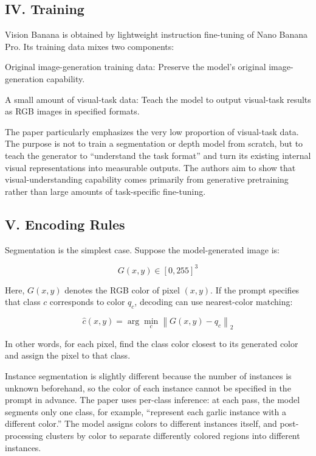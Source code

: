 \hypertarget{iv.-training}{%
\subsection{IV. Training}\label{iv.-training}}

Vision Banana is obtained by lightweight instruction fine-tuning of Nano Banana Pro. Its training data mixes two components:

Original image-generation training data: Preserve the model's original image-generation capability.

A small amount of visual-task data: Teach the model to output visual-task results as RGB images in specified formats.

The paper particularly emphasizes the very low proportion of visual-task data. The purpose is not to train a segmentation or depth model from scratch, but to teach the generator to ``understand the task format'' and turn its existing internal visual representations into measurable outputs. The authors aim to show that visual-understanding capability comes primarily from generative pretraining rather than large amounts of task-specific fine-tuning.

\hypertarget{v.-encoding-rules}{%
\subsection{V. Encoding Rules}\label{v.-encoding-rules}}

Segmentation is the simplest case. Suppose the model-generated image is:

\[
G(x, y) \in [0, 255]^3
\]

Here, \(G(x, y)\) denotes the RGB color of pixel \((x, y)\). If the prompt specifies that class \(c\) corresponds to color \(q_c\), decoding can use nearest-color matching:

\[
\hat{c}(x, y) = \arg\min_c \left\|G(x, y) - q_c\right\|_2
\]

In other words, for each pixel, find the class color closest to its generated color and assign the pixel to that class.

Instance segmentation is slightly different because the number of instances is unknown beforehand, so the color of each instance cannot be specified in the prompt in advance. The paper uses per-class inference: at each pass, the model segments only one class, for example, ``represent each garlic instance with a different color.'' The model assigns colors to different instances itself, and post-processing clusters by color to separate differently colored regions into different instances.

